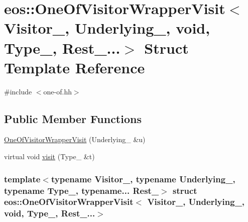 \hypertarget{structeos_1_1OneOfVisitorWrapperVisit_3_01Visitor___00_01Underlying___00_01void_00_01Type___00_01Rest___8_8_8_4}{
\section{eos::OneOfVisitorWrapperVisit$<$ Visitor\_\-, Underlying\_\-, void, Type\_\-, Rest\_\-...$>$ Struct Template Reference}
\label{structeos_1_1OneOfVisitorWrapperVisit_3_01Visitor___00_01Underlying___00_01void_00_01Type___00_01Rest___8_8_8_4}
}


{\ttfamily \#include $<$one-\/of.hh$>$}\subsection*{Public Member Functions}
\begin{DoxyCompactItemize}
\item 
\hyperlink{structeos_1_1OneOfVisitorWrapperVisit_3_01Visitor___00_01Underlying___00_01void_00_01Type___00_01Rest___8_8_8_4_a66d5952ec668457948e8ff1a657236fc}{OneOfVisitorWrapperVisit} (Underlying\_\- \&u)
\item 
virtual void \hyperlink{structeos_1_1OneOfVisitorWrapperVisit_3_01Visitor___00_01Underlying___00_01void_00_01Type___00_01Rest___8_8_8_4_a74791907b67583a00b9a3e373e3fa132}{visit} (Type\_\- \&t)
\end{DoxyCompactItemize}
\subsubsection*{template$<$typename Visitor\_\-, typename Underlying\_\-, typename Type\_\-, typename... Rest\_\-$>$ struct eos::OneOfVisitorWrapperVisit$<$ Visitor\_\-, Underlying\_\-, void, Type\_\-, Rest\_\-...$>$}



